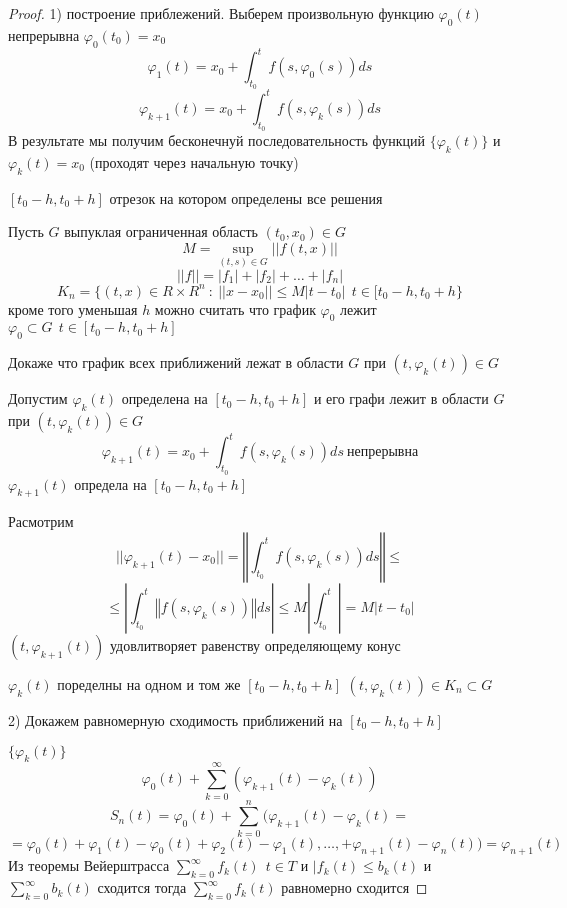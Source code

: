 \begin{proof}
  1) построение приблежений. Выберем произвольную функцию $\varphi_0(t)$
  непрерывна $\varphi_0(t_0) = x_0$
  $$
  \varphi_1(t) = x_0 + \int_{t_0}^t f(s, \varphi_0(s))ds
  $$
  $$
  \varphi_{k+1}(t) = x_0 + \int_{t_0}^t f(s, \varphi_k(s))ds
  $$
  В результате мы получим бесконечнуй последовательность функций
  $\{\varphi_k(t)\}$ и $\varphi_k(t) = x_0$ (проходят через начальную точку)

  $[t_0 - h, t_0 + h]$ отрезок на котором определены все решения

  Пусть $G$ выпуклая ограниченная область $(t_0, x_0) \in G$
  $$
  M = \sup_{(t,s) \in G} ||f(t,x)||
  $$
  $$
  ||f|| = |f_1| + |f_2| + \ldots + |f_n|
  $$
  $$
  K_n = \{(t,x) \in R \times R^n ~:~ ||x - x_0|| \le M|t-t_0| ~~
  t \in [t_0 - h, t_0 + h\}
  $$
  кроме того уменьшая $h$ можно считать что график $\varphi_0$ лежит
  $\varphi_0 \subset G ~~ t \in [t_0 - h, t_0 + h]$

  Докаже что график всех приближений лежат в области $G$ при $(t, \varphi_k(t))
  \in G$

  Допустим $\varphi_k(t)$ определена на $[t_0 - h, t_0 + h]$ и его графи лежит
  в области $G$ при $(t, \varphi_k(t)) \in G$
  $$
  \varphi_{k+1}(t) = x_0 + \int_{t_0}^t f(s, \varphi_k(s))ds ~
  \text{непрерывна}
  $$
  $\varphi_{k+1}(t)$ определа на $[t_0 - h, t_0 + h]$

  Расмотрим
  $$
  ||\varphi_{k+1}(t) - x_0|| = \left\Vert \int_{t_0}^t f(s, \varphi_k(s))ds
  \right\Vert \le
  $$
  $$
  \le \left| \int_{t_0}^t \left\Vert f(s, \varphi_k(s))\right\Vert ds \right|
  \le M\left| \int_{t_0}^t \right| = M|t-t_0|
  $$
  $(t, \varphi_{k+1}(t))$ удовлитворяет равенству определяющему конус

  $\varphi_k(t)$ поределны на одном и том же $[t_0 - h, t_0 + h]$ $(t,
  \varphi_k(t)) \in K_n \subset G$

  2) Докажем равномерную сходимость приближений на $[t_0 - h, t_0 + h]$

  $\{\varphi_k(t)\}$
  $$
  \varphi_0(t) + \sum_{k=0}^{\infty}(\varphi_{k+1}(t) - \varphi_k(t))
  $$
  $$
  S_n(t) = \varphi_0(t) + \sum_{k=0}^n (\varphi_{k+1}(t) - \varphi_k(t) =
  $$
  $$
  = \varphi_0(t) + \varphi_1(t) - \varphi_0(t) + \varphi_2(t) - \varphi_1(t),
  \ldots, + \varphi_{n+1}(t) - \varphi_n(t)) = \varphi_{n+1}(t)
  $$
  Из теоремы Вейерштрасса $\sum_{k=0}^{\infty} f_k(t) ~~ t \in T$ и
  $|f_k(t) \le b_k(t)$ и $\sum_{k=0}^{\infty} b_k(t)$ сходится тогда
  $\sum_{k=0}^{\infty} f_k(t)$ равномерно сходится


\end{proof}
